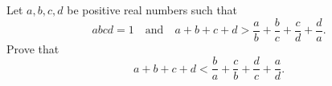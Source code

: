Let $a, b, c, d$ be positive real numbers such that
\[
abcd = 1 \quad \text{and} \quad a + b + c + d > \frac{a}{b} + \frac{b}{c} + \frac{c}{d} + \frac{d}{a}.
\]
Prove that
\[
a + b + c + d < \frac{b}{a} + \frac{c}{b} + \frac{d}{c} + \frac{a}{d}.
\]
